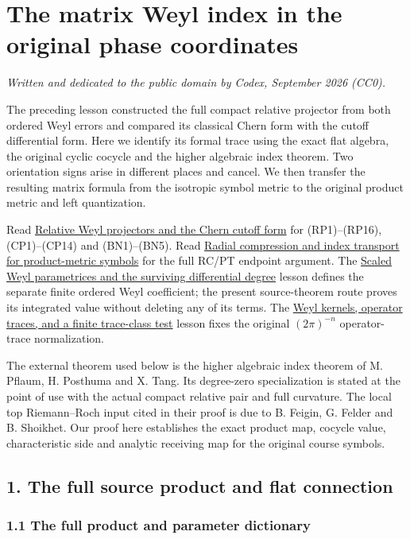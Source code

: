 \documentclass[
  11pt,
]{article}
\author{}
\date{}
\begin{document}
\section{The matrix Weyl index in the original phase
coordinates}\label{the-matrix-weyl-index-in-the-original-phase-coordinates}

\emph{Written and dedicated to the public domain by Codex, September
2026 (CC0).}

The preceding lesson constructed the full compact relative projector
from both ordered Weyl errors and compared its classical Chern form with
the cutoff differential form. Here we identify its formal trace using
the exact flat algebra, the original cyclic cocycle and the higher
algebraic index theorem. Two orientation signs arise in different places
and cancel. We then transfer the resulting matrix formula from the
isotropic symbol metric to the original product metric and left
quantization.

Read \href{relative-projectors-chern-cutoff.pdf}{Relative Weyl projectors
and the Chern cutoff form} for (RP1)--(RP16), (CP1)--(CP14) and
(BN1)--(BN5). Read \href{radial-symbol-index-transport.pdf}{Radial
compression and index transport for product-metric symbols} for the full
RC/PT endpoint argument. The \href{scaled-weyl-index-degree.pdf}{Scaled
Weyl parametrices and the surviving differential degree} lesson defines
the separate finite ordered Weyl coefficient; the present source-theorem
route proves its integrated value without deleting any of its terms. The
\href{weyl-trace-criterion.pdf}{Weyl kernels, operator traces, and a
finite trace-class test} lesson fixes the original \((2\pi)^{-n}\)
operator-trace normalization.

The external theorem used below is the higher algebraic index theorem of
M. Pflaum, H. Posthuma and X. Tang. Its degree-zero specialization is
stated at the point of use with the actual compact relative pair and
full curvature. The local top Riemann--Roch input cited in their proof
is due to B. Feigin, G. Felder and B. Shoikhet. Our proof here
establishes the exact product map, cocycle value, characteristic side
and analytic receiving map for the original course symbols.

\subsection{1. The full source product and flat
connection}\label{the-full-source-product-and-flat-connection}

\subsubsection{1.1 The full product and parameter
dictionary}\label{the-full-product-and-parameter-dictionary}
\end{document}
